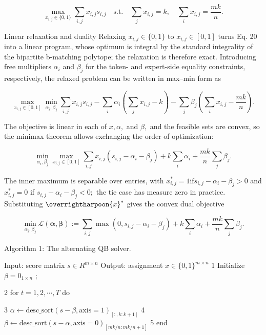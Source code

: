 \documentclass[
  10
]{article}
\begin{document}
\[
\max _ {x _ {i, j} \in \{0, 1 \}} \sum_ {i, j} x _ {i, j} s _ {i, j} \quad \text {s.t.} \quad \sum_ {j} x _ {i, j} = k, \quad \sum_ {i} x _ {i, j} = \frac {m k}{n}.\tag{20}
\]

Linear relaxation and duality Relaxing \(x _ { i , j } \in \{ 0 , 1 \}\)
to \(x _ { i , j } \in [ 0 , 1 ]\) turns Eq. 20 into a linear program,
whose optimum is integral by the standard integrality of the bipartite
b-matching polytope; the relaxation is therefore exact. Introducing free
multipliers \(\alpha _ { i }\) and \(\beta _ { j }\) for the token- and
expert-side equality constraints, respectively, the relaxed problem can
be written in max--min form as

\[
\max _ {x _ {i, j} \in [ 0, 1 ]} \min _ {\alpha_ {i}, \beta_ {j}} \sum_ {i, j} x _ {i, j} s _ {i, j} - \sum_ {i} \alpha_ {i} \left(\sum_ {j} x _ {i, j} - k\right) - \sum_ {j} \beta_ {j} \left(\sum_ {i} x _ {i, j} - \frac {m k}{n}\right).\tag{21}
\]

The objective is linear in each of \({ \mathbf { } } x , \alpha ,\) and
\(\beta ,\) and the feasible sets are convex, so the minimax theorem
allows exchanging the order of optimization:

\[
\min _ {\alpha_ {i}, \beta_ {j}} \max _ {x _ {i, j} \in [ 0, 1 ]} \sum_ {i, j} x _ {i, j} \left(s _ {i, j} - \alpha_ {i} - \beta_ {j}\right) + k \sum_ {i} \alpha_ {i} + \frac {m k}{n} \sum_ {j} \beta_ {j}.\tag{22}
\]

The inner maximum is separable over entries, with
\(x _ { i , j } ^ { * } = 1 \mathrm { i f } s _ { i , j } - \alpha _ { i } - \beta _ { j } > 0\)
and \(x _ { i , j } ^ { * } = 0\) if
\(s _ { i , j } - \alpha _ { i } - \beta _ { j } < 0 ;\) the tie case
has measure zero in practice. Substituting
\(\overrightharpoon { x } ^ { * }\) gives the convex dual objective

\[
\min _ {\alpha_ {i}, \beta_ {j}} \mathcal {L} (\boldsymbol {\alpha}, \boldsymbol {\beta}) := \sum_ {i, j} \max \left(0, s _ {i, j} - \alpha_ {i} - \beta_ {j}\right) + k \sum_ {i} \alpha_ {i} + \frac {m k}{n} \sum_ {j} \beta_ {j}.\tag{23}
\]

Algorithm 1: The alternating QB solver.

Input: score matrix \(s \in R^{m \times n}\) Output: assignment
\(x \in \{0, 1\}^{m \times n}\) 1 Initialize \(\beta = 0_{1 \times n}\)
;

2 for \(t = 1, 2, \cdots, T\) do

3
\(\alpha \leftarrow \text{desc\_sort}(s - \beta, \text{axis}=1)_{[:, k:k+1]}\)
4
\(\beta \leftarrow \text{desc\_sort}(s - \alpha, \text{axis}=0)_{[mk/n:mk/n+1]}\)
5 end
\end{document}
